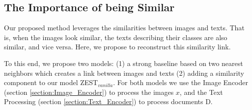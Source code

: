 \documentclass[11pt,a4paper]{article}
\newcommand\gal[1]{\textcolor{bright}{\textbf{GAL:} #1 }}
\newcommand\yuval[1]{\textcolor{darkpink}{\textbf{YUVAL:} #1 }}
\begin{document}
\subsection{The Importance of being Similar}
\label{section:similarity_component}


Our proposed method leverages the similarities between images and texts. That is, when the images look similar, the texts describing their classes are also similar, and vice versa. Here, we propose
to reconstruct this similarity link. 






 To this end, we propose two models: (1) a strong baseline based on two nearest neighbors which creates a link between images and texts (2) adding a similarity component to our model ZEST$_{vanilla}$.
For both models we use the Image Encoder (section \ref{section:Image_Encoder}) to process the images $x$, and the Text Processing (section \ref{section:Text_Encoder}) to process documents D.




%
%



\end{document}
